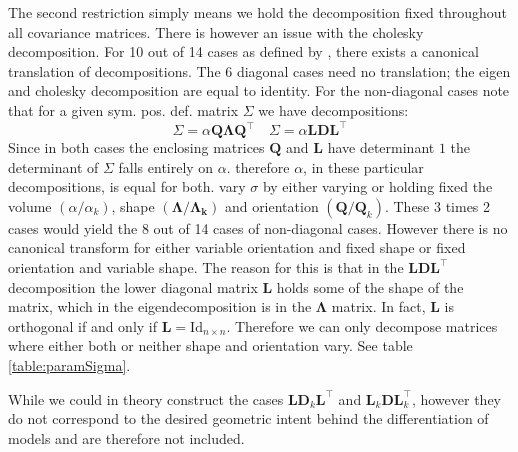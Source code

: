 The second restriction simply means we hold the decomposition fixed throughout 
all covariance matrices.
There is however an issue with the cholesky decomposition. For 10 out of 14
cases as defined by \cite{Cel95}, there exists a canonical translation of
decompositions.
The 6 diagonal cases need no translation; the eigen and cholesky decomposition
are equal to identity.
For the non-diagonal cases note that for a given sym. pos. def. matrix
$ \Sigma $ we have decompositions:
\begin{equation}
    \Sigma = \alpha \pmb{Q \Lambda Q}^\top \quad \Sigma =\alpha \pmb{L D L}^\top
\end{equation}
Since in both cases the enclosing matrices $ \pmb{Q} $ and $ \pmb{L} $ have 
determinant $ 1 $ the determinant of $ \Sigma $ falls entirely on $ \alpha $.
therefore $ \alpha $, in these particular decompositions, is equal for both.
\cite{Cel95} vary $\sigma$ by either varying or holding fixed the volume 
$(\alpha / \alpha_k)$, shape $(\pmb{\Lambda} / \pmb{\Lambda_k})$ and orientation
$(\pmb{Q} / \pmb{Q}_k)$.
These 3 times 2 cases would yield the 8 out of 14 cases of non-diagonal cases.
However there is no canonical transform for either variable orientation and 
fixed shape or fixed orientation and variable shape.
The reason for this is that in the $\pmb{LDL}^\top$ decomposition the lower
diagonal matrix $\pmb{L}$ holds some of the shape of the matrix, which in 
the eigendecomposition is in the $\pmb{\Lambda}$ matrix.
In fact, $\pmb{L}$ is orthogonal if and only if 
$\pmb{L} = \mathrm{Id}_{n\times n}$.
Therefore we can only decompose matrices where either both or neither shape and
orientation vary. See table \ref{table:paramSigma}.

While we could in theory construct the cases $\pmb{L}\pmb{D}_k\pmb{L}^\top$ and
$\pmb{L}_k \pmb{D} \pmb{L}_k^\top$, however they do not correspond to the desired
geometric intent behind the differentiation of models and are therefore not 
included.


